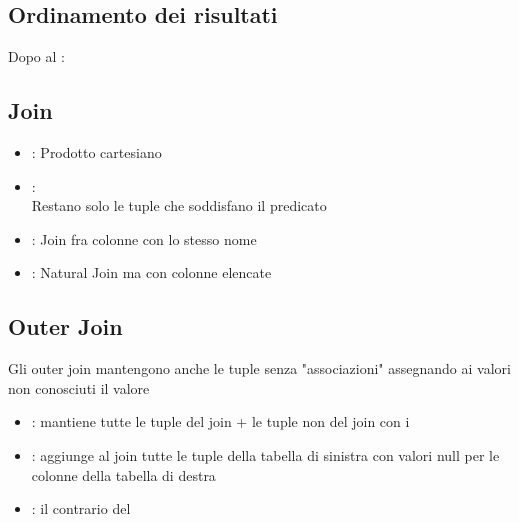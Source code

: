 \subsection{Ordinamento dei risultati}
Dopo al :\\

\subsection{Join}
\begin{itemize}
    \item {}: Prodotto cartesiano
    \item {}:\\Restano solo le tuple che soddisfano il predicato
    \item {}: Join fra colonne con lo stesso nome
    \item {}: Natural Join ma con colonne elencate
\end{itemize}

\subsection{Outer Join}
Gli outer join mantengono anche le tuple senza "associazioni" assegnando ai valori non conosciuti il valore 
\begin{itemize}
    \item {}: mantiene tutte le tuple del join + le tuple non del join con i 
    \item {}: aggiunge al join tutte le tuple della tabella di sinistra con valori null per le colonne della tabella di destra
    \item {}: il contrario del 
\end{itemize}

